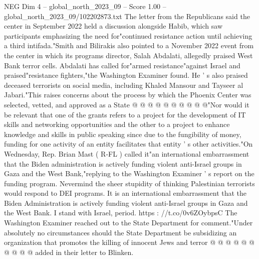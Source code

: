 \begin{textsample}{NEG Dim 4 – global\_north\_2023\_09 – Score 1.00 – global\_north\_2023\_09/102202873.txt}
The letter from the Republicans said the center in September 2022 held a discussion alongside Habib, which saw participants emphasizing the need for"continued resistance action until achieving a third intifada."Smith and Bilirakis also pointed to a November 2022 event from the center in which its programs director, Salah Abdalati, allegedly praised West Bank terror cells.
Abdalati has called for"armed resistance"against Israel and praised"resistance fighters,"the Washington Examiner found.
He ' s also praised deceased terrorists on social media, including Khaled Mansour and Tayseer al Jabari."This raises concerns about the process by which the Phoenix Center was selected, vetted, and approved as a State @ @ @ @ @ @ @ @ @ @"Nor would it be relevant that one of the grants refers to a project for the development of IT skills and networking opportunities and the other to a project to enhance knowledge and skills in public speaking since due to the fungibility of money, funding for one activity of an entity facilitates that entity ' s other activities."On Wednesday, Rep.
Brian Mast ( R-FL ) called it"an international embarrassment that the Biden administration is actively funding violent anti-Israel groups in Gaza and the West Bank,"replying to the Washington Examiner ' s report on the funding program.
Nevermind the sheer stupidity of thinking Palestinian terrorists would respond to DEI programs.
It is an international embarrassment that the Biden Administration is actively funding violent anti-Israel groups in Gaza and the West Bank.
I stand with Israel, period. https : //t.co/0v6ZOybpsC The Washington Examiner reached out to the State Department for comment."Under absolutely no circumstances should the State Department be subsidizing an organization that promotes the killing of innocent Jews and terror @ @ @ @ @ @ @ @ @ @ added in their letter to Blinken.

\end{textsample}
